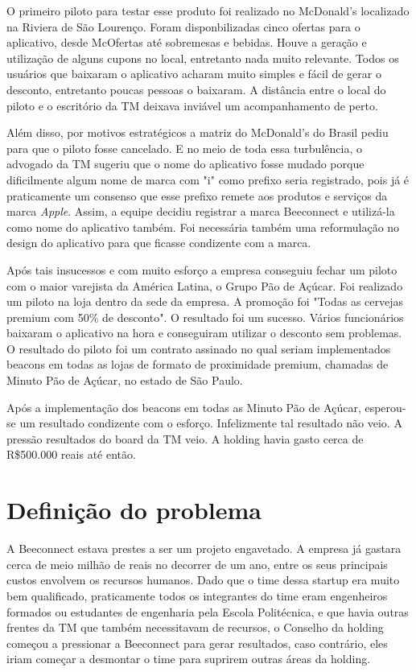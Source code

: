 O primeiro piloto para testar esse produto foi realizado no McDonald's localizado na Riviera de São Lourenço. Foram disponbilizadas cinco ofertas para o aplicativo, desde McOfertas até sobremesas e bebidas.
Houve a geração e utilização de alguns cupons no local, entretanto nada muito relevante. Todos os usuários que baixaram o aplicativo acharam muito simples e fácil de gerar o desconto, entretanto poucas pessoas o baixaram. A distância entre o local do piloto e o escritório da TM deixava inviável um acompanhamento de perto. 

Além disso, por motivos estratégicos a matriz do McDonald's do Brasil pediu para que o piloto fosse cancelado. E no meio de toda essa turbulência, o advogado da TM sugeriu que o nome do aplicativo fosse mudado porque dificilmente algum nome de marca com "i" como prefixo seria registrado, pois já é praticamente um consenso que esse prefixo remete aos produtos e serviços da marca \textit{Apple}. Assim, a equipe decidiu registrar a marca Beeconnect e utilizá-la como nome do aplicativo também. Foi necessária também uma reformulação no design do aplicativo para que ficasse condizente com a marca.

Após tais insucessos e com muito esforço a empresa conseguiu fechar um piloto com o maior varejista da América Latina, o Grupo Pão de Açúcar. Foi realizado um piloto na loja dentro da sede da empresa. A promoção foi "Todas as cervejas premium com 50\% de desconto". O resultado foi um sucesso. Vários funcionários baixaram o aplicativo na hora e conseguiram utilizar o desconto sem problemas. O resultado do piloto foi um contrato assinado no qual seriam implementados beacons em todas as lojas de formato de proximidade premium, chamadas de Minuto Pão de Açúcar, no estado de São Paulo.

Após a implementação dos beacons em todas as Minuto Pão de Açúcar, esperou-se um resultado condizente com o esforço. Infelizmente tal resultado não veio. A pressão resultados do board da TM veio. A holding havia gasto cerca de R\$500.000 reais até então.

\section{Definição do problema}
\label{cha:definição_do_problema}
A Beeconnect estava prestes a ser um projeto engavetado. A empresa já gastara cerca de meio milhão de reais no decorrer de um ano, entre os seus principais custos envolvem os recursos humanos. Dado que o time dessa startup era muito bem qualificado, praticamente todos os integrantes do time eram engenheiros formados ou estudantes de engenharia pela Escola Politécnica, e que havia outras frentes da TM que também necessitavam de recursos, o Conselho da holding começou a pressionar a Beeconnect para gerar resultados, caso contrário, eles iriam começar a desmontar o time para suprirem outras áreas da holding.

